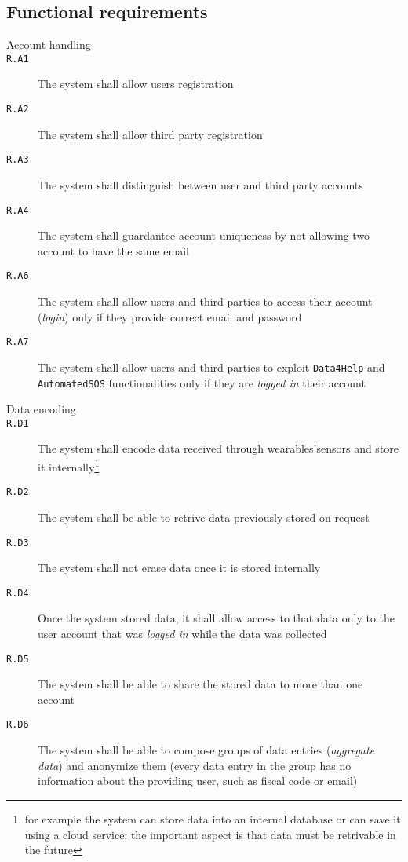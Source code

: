 
  \subsection{Functional requirements}

    \begin{description}
      \item[Account handling]
      \item[\texttt{R.A1}] The system shall allow users registration
      \item[\texttt{R.A2}] The system shall allow third party registration
      \item[\texttt{R.A3}] The system shall distinguish between user and third party accounts
      \item[\texttt{R.A4}] The system shall guardantee account uniqueness by not allowing two account to have the same email
      \item[\texttt{R.A6}] The system shall allow users and third parties to access their account (\textit{login}) only if they provide correct email and password
      \item[\texttt{R.A7}] The system shall allow users and third parties to exploit \texttt{Data4Help} and \texttt{AutomatedSOS} functionalities only if they are \textit{logged in} their account

      \item[Data encoding]
      \item[\texttt{R.D1}] The system shall encode data received through wearables'sensors and store it internally\footnote{for example the system can store data into an internal database or can save it using a cloud service; the important aspect is that data must be retrivable in the future}
      \item[\texttt{R.D2}] The system shall be able to retrive data previously stored on request
      \item[\texttt{R.D3}] The system shall not erase data once it is stored internally
      \item[\texttt{R.D4}] Once the system stored data, it shall allow access to that data only to the user account that was \textit{logged in} while the data was collected
      \item[\texttt{R.D5}] The system shall be able to share the stored data to more than one account
      \item[\texttt{R.D6}] The system shall be able to compose groups of data entries (\textit{aggregate data}) and anonymize them (every data entry in the group has no information about the providing user, such as fiscal code or email)


\end{description}
